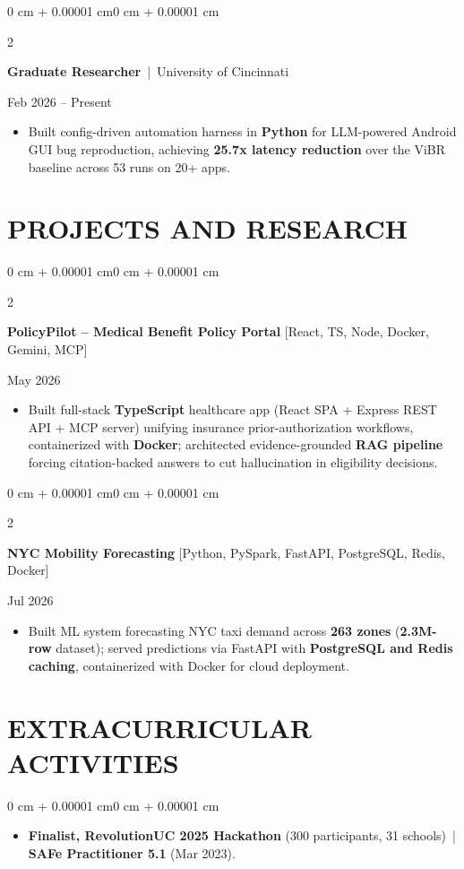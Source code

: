 \documentclass[10pt, letterpaper]{article}
\newenvironment{highlights}{
    \begin{itemize}[
        topsep=0.10 cm,
        parsep=0.06 cm,
        partopsep=0pt,
        itemsep=0.06 cm,
        leftmargin=12pt
    ]
}{
    \end{itemize}
}
\newenvironment{onecolentry}{
    \begin{adjustwidth}{0 cm + 0.00001 cm}{0 cm + 0.00001 cm}
}{
    \end{adjustwidth}
}
\newenvironment{twocolentry}[2][]{
    \onecolentry
    \def\secondColumn{#2}
    \setcolumnwidth{\fill, 4.5 cm}
    \begin{paracol}{2}
}{
    \switchcolumn \raggedleft \secondColumn
    \end{paracol}
    \endonecolentry
}
\begin{document}
\vspace{0.15 cm}

\begin{twocolentry}{Feb 2026 -- Present}
\textbf{Graduate Researcher} \,|\, University of Cincinnati
\end{twocolentry}
\begin{highlights}
  \item Built config-driven automation harness in \textbf{Python} for LLM-powered Android GUI bug reproduction, achieving \textbf{25.7x latency reduction} over the ViBR baseline across 53 runs on 20+ apps.
\end{highlights}

\section{PROJECTS AND RESEARCH}
\begin{twocolentry}{May 2026}
\textbf{PolicyPilot -- Medical Benefit Policy Portal} [React, TS, Node, Docker, Gemini, MCP]
\end{twocolentry}
\begin{highlights}
  \item Built full-stack \textbf{TypeScript} healthcare app (React SPA + Express REST API + MCP server) unifying insurance prior-authorization workflows, containerized with \textbf{Docker}; architected evidence-grounded \textbf{RAG pipeline} forcing citation-backed answers to cut hallucination in eligibility decisions.
\end{highlights}

\vspace{0.12 cm}

\begin{twocolentry}{Jul 2026}
\textbf{NYC Mobility Forecasting} [Python, PySpark, FastAPI, PostgreSQL, Redis, Docker]
\end{twocolentry}
\begin{highlights}
  \item Built ML system forecasting NYC taxi demand across \textbf{263 zones} (\textbf{2.3M-row} dataset); served predictions via FastAPI with \textbf{PostgreSQL and Redis caching}, containerized with Docker for cloud deployment.
\end{highlights}

\section{EXTRACURRICULAR ACTIVITIES}
\begin{onecolentry}
\begin{highlights}
  \item \textbf{Finalist, RevolutionUC 2025 Hackathon} (300 participants, 31 schools) \,|\, \textbf{SAFe Practitioner 5.1} (Mar 2023).
\end{highlights}
\end{onecolentry}
\end{document}
